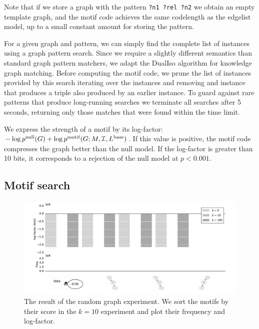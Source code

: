 \documentclass[letterpaper]{article} %
\newcommand{\I}{{\cal I}}
\begin{document}
Note that if we store a graph with the pattern \texttt{?n1 ?rel ?n2} we obtain an empty template graph, and the motif code achieves the same codelength as the edgelist model, up to a small constant amount for storing the pattern.

For a given graph and pattern, we can simply find the complete list of instances using a graph pattern search. Since we require a slightly different semantics than standard graph pattern matchers, we adapt the DualIso algorithm \cite{saltz2014dualiso} for knowledge graph matching. Before computing the motif code, we prune the list of instances provided by this search iterating over the instances and removing and instance that produces a triple also produced by an earlier instance. To guard against rare patterns that produce long-running searches we terminate all searches after 5 seconds, returning  only those matches that were found within the time limit.

We express the strength of a motif by its log-factor: $-\log p^\text{null}(G) + \log p^\text{motif}(G; M, \I, L^\text{base})$. If this value is positive, the motif code compresses the graph better than the null model. If the log-factor is greater than 10 bits, it corresponds to a rejection of the null model at $p < 0.001$.

\subsection{Motif search}


\begin{figure}[tb]
  \centering
    \includegraphics[width=\linewidth]{synthetic-plot.pdf}
    \caption{The result of the random graph experiment. We sort the motifs by their score in the $k=10$ experiment and plot their frequency and log-factor.}
    \label{figure:synthetic}
\end{figure}

\label{section:search}
\end{document}
